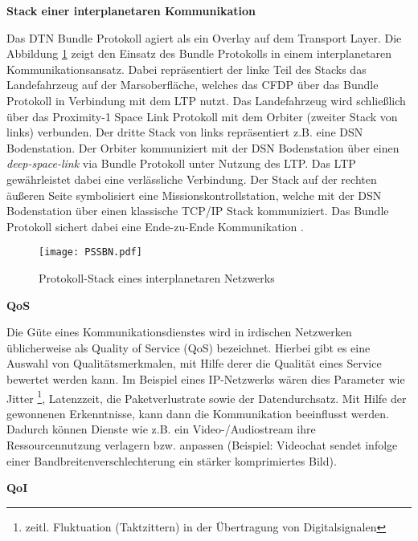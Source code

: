 \textbf{Stack einer interplanetaren Kommunikation}

Das \gls{DTN} Bundle Protokoll agiert als ein Overlay auf dem Transport Layer. Die
Abbildung \ref{fig:PSSBN} zeigt den Einsatz des Bundle Protokolls in einem
interplanetaren Kommunikationsansatz.
Dabei repr{\"a}sentiert der linke Teil des Stacks das Landefahrzeug auf der
Marsoberfl{\"a}che, welches das \gls{CFDP} {\"u}ber das Bundle Protokoll in
Verbindung mit dem \gls{LTP} nutzt.
Das Landefahrzeug wird schlie{\ss}lich {\"u}ber das Proximity-1 Space Link
Protokoll mit dem Orbiter (zweiter Stack von links) verbunden. Der dritte Stack
von links repr{\"a}sentiert z.B. eine \gls{DSN} Bodenstation. Der
Orbiter kommuniziert mit der \gls{DSN} Bodenstation {\"u}ber einen
\textit{deep-space-link} via Bundle Protokoll unter Nutzung des \gls{LTP}. Das
\gls{LTP} gew{\"a}hrleistet dabei eine verl{\"a}ssliche Verbindung. Der Stack
auf der rechten {\"a}u{\ss}eren Seite symbolisiert eine Missionskontrollstation,
welche mit der \gls{DSN} Bodenstation {\"u}ber einen klassische
\gls{TCP}/\gls{IP} Stack kommuniziert. Das Bundle Protokoll sichert dabei eine
Ende-zu-Ende Kommunikation \cite{DTNBundle}.

\begin{figure}[H]
\centering
\texttt{[image: PSSBN.pdf]}
\caption[Protokoll-Stack eines interplanetaren Netzwerks]
{Protokoll-Stack eines interplanetaren Netzwerks \cite{DTNBundle}}
\label{fig:PSSBN}
\end{figure}

\textbf{\gls{QoS}}

Die G{\"u}te eines Kommunikationsdienstes wird in irdischen Netzwerken
{\"u}blicherweise als Quality of Service (QoS) bezeichnet. Hierbei gibt es eine
Auswahl von Qualit{\"a}tsmerkmalen, mit Hilfe derer die Qualit{\"a}t eines
Service bewertet werden kann. Im Beispiel eines IP-Netzwerks w{\"a}ren dies
Parameter wie Jitter \footnote{zeitl. Fluktuation (Taktzittern) in der
{\"U}bertragung von Digitalsignalen}, Latenzzeit, die Paketverlustrate sowie der
Datendurchsatz. Mit Hilfe der gewonnenen Erkenntnisse, kann dann die
Kommunikation beeinflusst werden. Dadurch k{\"o}nnen Dienste wie z.B. ein
Video-/Audiostream ihre Ressourcennutzung verlagern bzw. anpassen
(Beispiel: Videochat sendet infolge einer Bandbreitenverschlechterung ein
st{\"a}rker komprimiertes Bild). 

\textbf{\gls{QoI}} 


